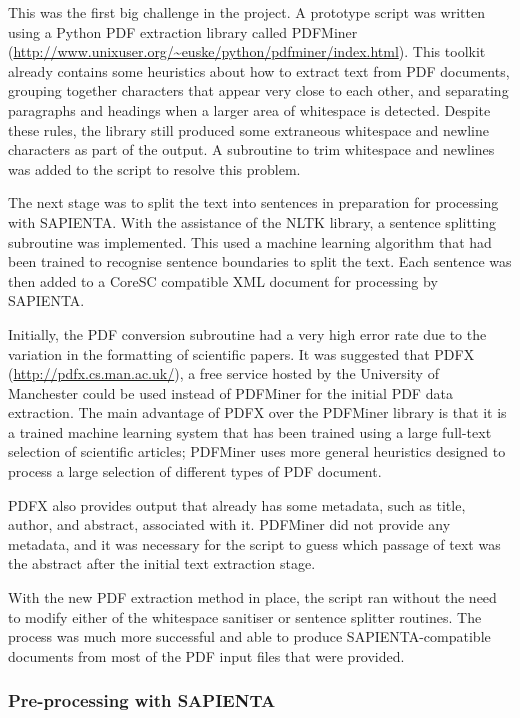 \documentclass[12pt,a4paper]{article}
\begin{document}
This was the first big challenge in the project. A prototype script was written
using a Python PDF extraction library called PDFMiner
(\url{http://www.unixuser.org/~euske/python/pdfminer/index.html}).  This
toolkit already contains some heuristics about how to extract text from PDF
documents, grouping together characters that appear very close to each other,
and separating paragraphs and headings when a larger area of whitespace is
detected\cite{pdfminer}. Despite these rules, the library still produced some
extraneous whitespace and newline characters as part of the output. A
subroutine to trim whitespace and newlines was added to the script to resolve
this problem. 

The next stage was to split the text into sentences in preparation for
processing with SAPIENTA. With the assistance of the NLTK library, a sentence
splitting subroutine was implemented. This used a machine learning algorithm
that had been trained to recognise sentence boundaries to split the text. Each
sentence was then added to a CoreSC compatible XML document for processing by
SAPIENTA.

Initially, the PDF conversion subroutine had a very high error rate due to the
variation in the formatting of scientific papers. It was suggested that PDFX
(\url{http://pdfx.cs.man.ac.uk/}), a free service hosted by the University of
Manchester could be used instead of PDFMiner for the initial PDF data
extraction. The main advantage of PDFX over the PDFMiner library is that it is a
trained machine learning system that has been trained using a large full-text
selection of scientific articles; PDFMiner uses more general heuristics
designed to process a large selection of different types of PDF document.

PDFX also provides output that already has some metadata, such as title,
author, and abstract, associated with it. PDFMiner did not provide any
metadata, and it was necessary for the script to guess which passage of text
was the abstract after the initial text extraction stage.

With the new PDF extraction method in place, the script ran without the need
to modify either of the whitespace sanitiser or sentence splitter routines. The
process was much more successful and able to produce SAPIENTA-compatible
documents from most of the PDF input files that were provided.

\subsubsection{Pre-processing with SAPIENTA}
\end{document}
